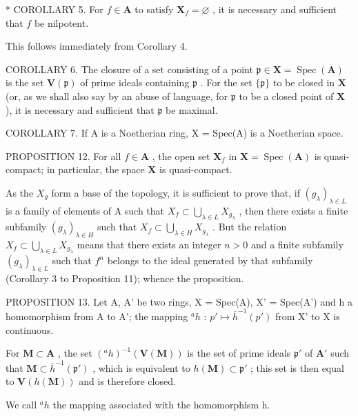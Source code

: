 * COROLLARY 5. For \(f \in \mathbf{A}\) to satisfy \(\mathbf{X}_f = \varnothing\) , it is necessary and sufficient that \(f\) be nilpotent.

This follows immediately from Corollary 4.

COROLLARY 6. The closure of a set consisting of a point \(\mathfrak{p} \in \mathbf{X} = \operatorname{Spec}(\mathbf{A})\) is the set \(\mathbf{V}(\mathfrak{p})\) of prime ideals containing \(\mathfrak{p}\) . For the set \(\{\mathfrak{p}\}\) to be closed in \(\mathbf{X}\) (or, as we shall also say by an abuse of language, for \(\mathfrak{p}\) to be a closed point of \(\mathbf{X}\) ), it is necessary and sufficient that \(\mathfrak{p}\) be maximal.

COROLLARY 7. If A is a Noetherian ring, X = Spec(A) is a Noetherian space.

PROPOSITION 12. For all \(f \in \mathbf{A}\) , the open set \(\mathbf{X}_f\) in \(\mathbf{X} = \operatorname{Spec}(\mathbf{A})\) is quasi-compact; in particular, the space \(\mathbf{X}\) is quasi-compact.

As the \(X_{g}\) form a base of the topology, it is sufficient to prove that, if \((g_{\lambda})_{\lambda\in L}\) is a family of elements of A such that \(X_{f}\subset\bigcup_{\lambda\in L}X_{g_{\lambda}}\) , then there exists a finite subfamily \((g_{\lambda})_{\lambda\in H}\) such that \(X_{f}\subset\bigcup_{\lambda\in H}X_{g_{\lambda}}\) . But the relation \(X_{f}\subset\bigcup_{\lambda\in L}X_{g_{\lambda}}\) means that there exists an integer \(n > 0\) and a finite subfamily \((g_{\lambda})_{\lambda\in L}\) such that \(f^{n}\) belongs to the ideal generated by that subfamily (Corollary 3 to Proposition 11); whence the proposition.

PROPOSITION 13. Let A, A' be two rings, X = Spec(A), X' = Spec(A') and h a homomorphism from A to A'; the mapping \(^a h\) : \(p' \mapsto \overline{h}^{-1}(p')\) from X' to X is continuous.

For \(\mathbf{M} \subset \mathbf{A}\) , the set \((^a h)^{-1}(\mathbf{V}(\mathbf{M}))\) is the set of prime ideals \(\mathfrak{p}'\) of \(\mathbf{A}'\) such that \(\mathbf{M} \subset \overline{h}^{-1}(\mathfrak{p}')\) , which is equivalent to \(h(\mathbf{M}) \subset \mathfrak{p}'\) ; this set is then equal to \(\mathbf{V}(h(\mathbf{M}))\) and is therefore closed.

We call \(^{a}h\) the mapping associated with the homomorphism h.

